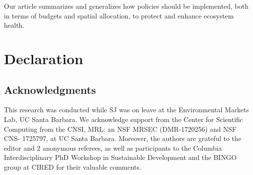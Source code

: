 
Our article summarizes and generalizes how policies should be implemented, both in terms of budgets and spatial allocation, to protect and enhance ecosystem health.

\section{Declaration}
\subsection*{Acknowledgments}
This research was conducted while SJ was on leave at the Environmental Markets Lab, UC Santa Barbara. We acknowledge support from the Center for Scientific Computing from the CNSI, MRL: an NSF MRSEC (DMR-1720256) and NSF CNS- 1725797, at UC Santa Barbara. Moreover, the authors are grateful to the editor and 2 anonymous referees, as well as participants to the Columbia Interdisciplinary PhD Workshop in Sustainable Development and the BINGO group at CIRED for their valuable comments. 

